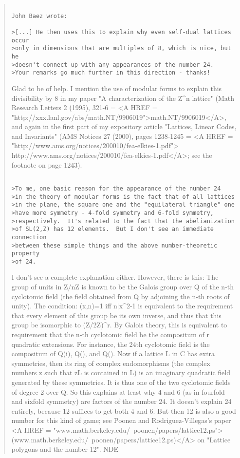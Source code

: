 \begin{quote}

\begin{verbatim}

John Baez wrote:
 
>[...] He then uses this to explain why even self-dual lattices occur
>only in dimensions that are multiples of 8, which is nice, but he
>doesn't connect up with any appearances of the number 24.  
>Your remarks go much further in this direction - thanks!  
\end{verbatim}
    
Glad to be of help.  I mention the use of modular forms to explain this
divisibility by 8 in my paper "A characterization of the Z^{n} lattice"
(Math Research Letters 2 (1995), 321-6 = <A HREF = "http://xxx.lanl.gov/abs/math.NT/9906019">math.NT/9906019</A>, and again
in the first part of my expository article "Lattices, Linear Codes,
and Invariants" (AMS Notices 27 (2000), pages 1238-1245 =
<A HREF = "http://www.ams.org/notices/200010/fea-elkies-1.pdf">
http://www.ams.org/notices/200010/fea-elkies-1.pdf</A>; see the footnote
on page 1243).

\begin{verbatim}

>To me, one basic reason for the appearance of the number 24
>in the theory of modular forms is the fact that of all lattices
>in the plane, the square one and the "equilateral triangle" one 
>have more symmetry - 4-fold symmetry and 6-fold symmetry,
>respectively.  It's related to the fact that the abelianization
>of SL(2,Z) has 12 elements.  But I don't see an immediate connection
>between these simple things and the above number-theoretic property 
>of 24.
\end{verbatim}
    
I don't see a complete explanation either.  However, there is this:
The group of units in Z/nZ is known to be the Galois group over Q
of the n-th cyclotomic field (the field obtained from Q by adjoining
the n-th roots of unity).
The condition:  (x,n)=1 iff n|x^{2}-1  is equivalent to the requirement
that every element of this group be its own inverse, and thus that
this group be isomorphic to (Z/2Z)^{r}.
By Galois theory, this is equivalent to requirement that the n-th
cyclotomic field be the compositum of r quadratic extensions.
For instance, the 24th cyclotomic field is the compositum of
Q(i), Q(), and Q().
Now if a lattice L in C has extra symmetries, then its ring of complex
endomorphisms (the complex numbers z such that zL is contained in L)
is an imaginary quadratic field generated by these symmetries.
It is thus one of the two cyclotomic fields of degree 2 over Q.
So this explains at least why 4 and 6 (as in fourfold and sixfold
symmetry) are factors of the number 24.  It doesn't explain 24 entirely,
because 12 suffices to get both 4 and 6.  But then 12 is also a good
number for this kind of game; see Poonen and Rodriguez-Villegas's paper
<A HREF = "www.math.berkeley.edu/~poonen/papers/lattice12.ps">
(www.math.berkeley.edu/~poonen/papers/lattice12.ps)</A> on "Lattice polygons
and the number 12".
NDE
\end{quote}

